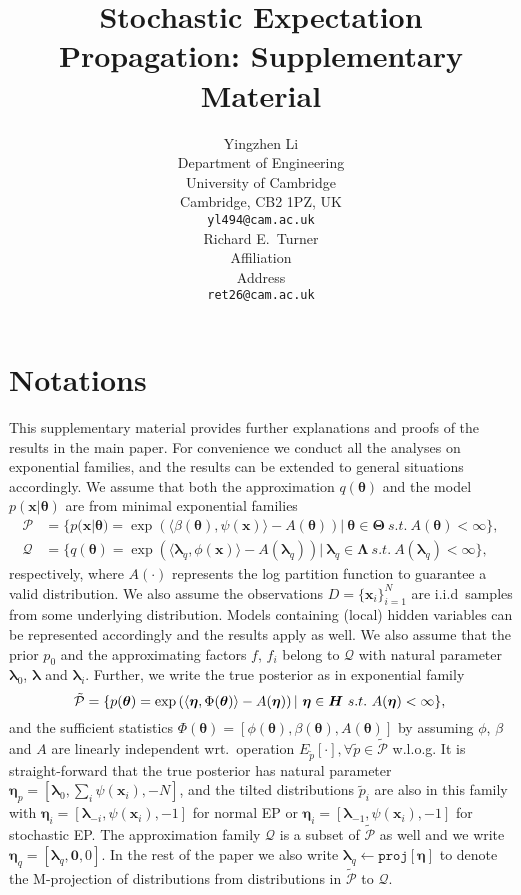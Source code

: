 \documentclass{article} %
\title{Stochastic Expectation Propagation: Supplementary Material}
\author{
Yingzhen Li \\
Department of Engineering\\
University of Cambridge\\
Cambridge, CB2 1PZ, UK \\
\texttt{yl494@cam.ac.uk} \\
\And
Richard E.~Turner \\
Affiliation \\
Address \\
\texttt{ret26@cam.ac.uk} \\
}
\begin{document}
\maketitle

\section*{Notations}
This supplementary material provides further explanations and proofs of the results in the main paper. For convenience we conduct all the analyses on exponential families, and the results can be extended to general situations accordingly. We assume that both the approximation $q(\bm{\theta})$ and the model $p(\bm{x} | \bm{\theta})$ are from minimal exponential families
\begin{align}
\mathcal{P} &= \{p(\bm{x} | \bm{\theta}) = \exp \left( \langle \beta(\bm{\theta}), \psi(\bm{x}) \rangle - A(\bm{\theta}) \right) |\ \bm{\theta} \in \bm{\Theta} \ s.t.~ A(\bm{\theta}) < \infty \}, \\
\mathcal{Q} &= \{q(\bm{\theta}) = \exp \left( \langle \bm{\lambda}_q, \phi(\bm{x}) \rangle - A(\bm{\lambda}_q) \right) |\ \bm{\lambda}_q \in \bm{\Lambda} \ s.t.~ A(\bm{\lambda}_q) < \infty \},
\end{align}
respectively, where $A(\cdot)$ represents the log partition function to guarantee a valid distribution. We also assume the observations $D = \{\bm{x}_i\}_{i=1}^N$ are i.i.d~samples from some underlying distribution. Models containing (local) hidden variables can be represented accordingly and the results apply as well. We also assume that the prior $p_0$ and the approximating factors $f$, $f_i$ belong to $\mathcal{Q}$ with natural parameter $\bm{\lambda}_0$, $\bm{\lambda}$ and $\bm{\lambda}_i$. Further, we write the true posterior as in exponential family
\begin{equation}
\mathcal{\tilde{P}} = \{p(\bm{\theta}) = \exp \left( \langle \bm{\eta}, \Phi(\bm{\theta}) \rangle - A(\bm{\eta}) \right) |\ \bm{\eta} \in \bm{H} \ s.t.~ A(\bm{\eta}) < \infty \}, \\
\end{equation}
and the sufficient statistics $\Phi(\bm{\theta}) = [\phi(\bm{\theta}), \beta(\bm{\theta}), A(\bm{\theta})]$ by assuming $\phi$, $\beta$ and $A$ are linearly independent wrt.~operation $E_{\tilde{p}}[\cdot], \forall \tilde{p} \in \tilde{\mathcal{P}}$ w.l.o.g. It is straight-forward that the true posterior has natural parameter $\bm{\eta}_p = [\bm{\lambda}_0, \sum_{i} \psi(\bm{x}_i), -N]$, and the tilted distributions $\tilde{p}_i$ are also in this family with $\bm{\eta}_i = [\bm{\lambda}_{-i}, \psi(\bm{x}_i), -1]$ for normal EP or $\bm{\eta}_i = [\bm{\lambda}_{-1}, \psi(\bm{x}_i), -1]$ for stochastic EP. The approximation family $\mathcal{Q}$ is a subset of $\tilde{\mathcal{P}}$ as well and we write $\bm{\eta}_q = [\bm{\lambda}_q, \bm{0}, 0]$. In the rest of the paper we also write $\bm{\lambda}_q \leftarrow \mathtt{proj}[\bm{\eta}]$ to denote the M-projection of distributions from distributions in $\mathcal{\tilde{P}}$ to $\mathcal{Q}$.
\end{document}
